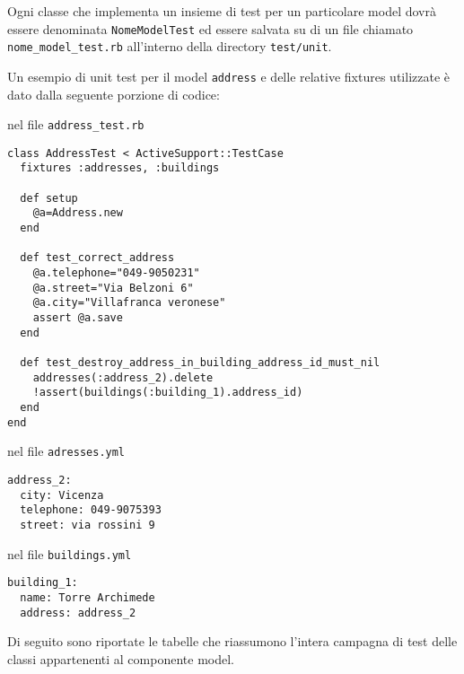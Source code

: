 \documentclass[11pt,a4paper]{article}
\begin{document}
Ogni classe che implementa un insieme di test per un particolare model dovrà essere denominata \verb|NomeModelTest| ed essere salvata su di un file chiamato \verb|nome_model_test.rb| all'interno della directory \verb|test/unit|.

Un esempio di unit test per il model \verb|address| e delle relative fixtures utilizzate è dato dalla seguente porzione di codice:

nel file \verb|address_test.rb|
\begin{verbatim}
class AddressTest < ActiveSupport::TestCase
  fixtures :addresses, :buildings

  def setup
    @a=Address.new
  end
  
  def test_correct_address
    @a.telephone="049-9050231"
    @a.street="Via Belzoni 6"
    @a.city="Villafranca veronese"
    assert @a.save
  end

  def test_destroy_address_in_building_address_id_must_nil
    addresses(:address_2).delete
    !assert(buildings(:building_1).address_id)
  end
end
\end{verbatim}

nel file \verb|adresses.yml|
\begin{verbatim}
address_2:
  city: Vicenza
  telephone: 049-9075393
  street: via rossini 9
\end{verbatim}

nel file \verb|buildings.yml|
\begin{verbatim}
building_1:
  name: Torre Archimede
  address: address_2
\end{verbatim}


Di seguito sono riportate le tabelle che riassumono l'intera campagna di test delle classi appartenenti al componente model.
\end{document}
